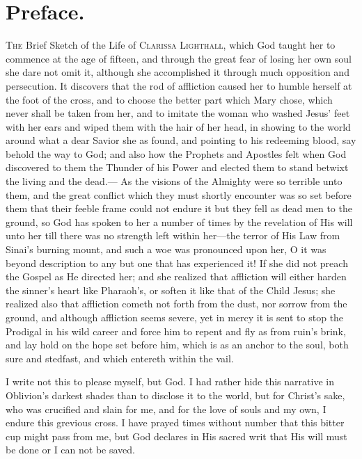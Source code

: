 \documentclass{article}
\renewcommand\footnote[1]{} %
\begin{document}
\section*{Preface.}
\textsc{The} Brief Sketch of the Life of \textsc{Clarissa Lighthall}, which God taught her to commence at the age of fifteen\footnote{in the year 1816}, and through the great fear of losing her own soul she dare not omit it, although she accomplished it through much opposition and persecution.
It discovers that the rod of affliction caused her to humble herself at the foot of the cross, and to choose the better part which Mary chose, which never shall be taken from her, and to imitate the woman who washed Jesus' feet with her ears and wiped them with the hair of her head, in showing to the world around what a dear Savior she as found, and pointing to his redeeming blood, say behold the way to God; and also how the Prophets and Apostles felt when God discovered to them the Thunder of his Power and elected them to stand betwixt the living and the dead.---
As the visions of the Almighty were so terrible unto them, and the great conflict which they must shortly encounter was so set before them that their feeble frame could not endure it but they fell as dead men to the ground, so God has spoken to her a number of times by the revelation of His will unto her till there was no strength left within her---the terror of His Law from Sinai's burning mount, and such a woe was pronounced upon her, O it was beyond description to any but one that has experienced it!
If she did not preach the Gospel as He directed her; and she realized that affliction will either harden the sinner's heart like Pharaoh's, or soften it like that of the Child Jesus; she realized also that affliction cometh not forth from the dust, nor sorrow from the ground, and although affliction seems severe, yet in mercy it is sent to stop the Prodigal in his wild career and force him to repent and fly as from ruin's brink, and lay hold on the hope set before him, which is as an anchor to the soul, both sure and stedfast, and which entereth within the vail.

I write not this to please myself, but God.
I had rather hide this narrative in Oblivion's darkest shades than to disclose it to the world, but for Christ's sake, who was crucified and slain for me, and for the love of souls and my own, I endure this grevious cross.
I have prayed times without number that this bitter cup might pass from me, but God declares in His sacred writ that His will must be done or I can not be saved.
\end{document}
